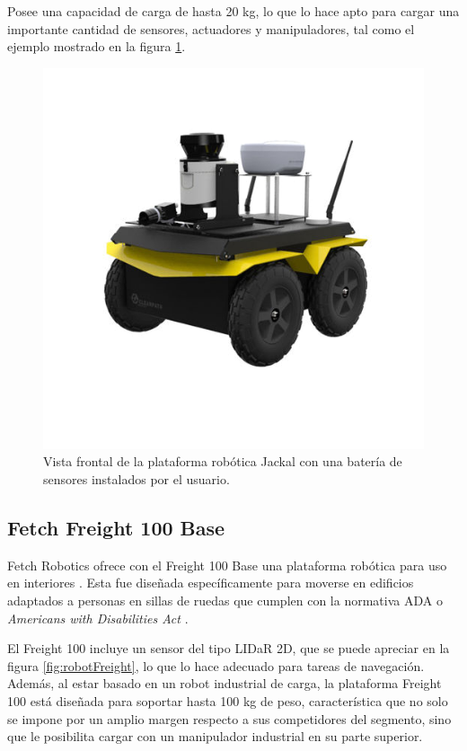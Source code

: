 Posee una capacidad de carga de hasta 20 kg, lo que lo hace apto para cargar una importante cantidad de sensores, actuadores y manipuladores, tal como el ejemplo mostrado en la figura \ref{fig:robotJackal}.

\begin{figure}[ht]
	\centering
	\includegraphics[scale=1.6]{./Figures/jackal.png}
	\caption{Vista frontal de la plataforma robótica Jackal con una batería de sensores instalados por el usuario\protect\footnotemark.}
	\label{fig:robotJackal}
\end{figure}


\subsection{Fetch Freight 100 Base}

Fetch Robotics ofrece con el Freight 100 Base una plataforma robótica para uso en interiores \citep{PAPER:1}. Esta fue diseñada específicamente para moverse en edificios adaptados a personas en sillas de ruedas que cumplen con la normativa ADA o \textit{Americans with Disabilities Act} \citep{ACT:1}.

El Freight 100 incluye un sensor del tipo LIDaR 2D, que se puede apreciar en la figura \ref{fig:robotFreight}, lo que lo hace adecuado para tareas de navegación. Además, al estar basado en un robot industrial de carga, la plataforma Freight 100 está diseñada para soportar hasta 100 kg de peso, característica que no solo se impone por un amplio margen respecto a sus competidores del segmento, sino que le posibilita cargar con un manipulador industrial en su parte superior.

